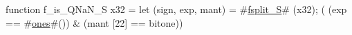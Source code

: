 function f_is_QNaN_S   x32 = {
  let (sign, exp, mant) = #\hyperref[sailRISCVzfsplitzyS]{fsplit\_S}# (x32);
  (  (exp == #\hyperref[sailRISCVzones]{ones}#())
   & (mant [22] == bitone))
}
